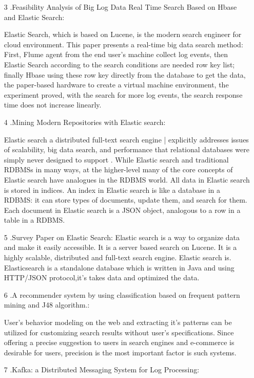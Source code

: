 \documentclass[oneside,a4paper,12pt]{book}
\begin{document}
\begin{enumerate}
\begin{itemize}
   \item[3].Feasibility Analysis of Big Log Data Real Time Search Based on Hbase and Elastic Search: 
 
Elastic Search, which is based on Lucene, is the modern search engineer for cloud environment. This paper presents a real-time big data search method: First, Flume agent from the end user's machine collect log events, then Elastic Search according to the search conditions are needed row key list; finally Hbase using these row key directly from the database to get the data, the paper-based hardware to create a virtual machine environment, the experiment proved, with the search for more log events, the search response time does not increase linearly.

   \item[4].Mining Modern Repositories with Elastic search: 
 
Elastic search  a distributed full-text search engine | explicitly addresses issues of scalability, big data search, and performance that relational databases were simply never designed to support . While Elastic search and traditional RDBMSs
 in many ways, at the higher-level many of the core concepts of Elastic search have analogues in the RDBMS world. All data in Elastic search is stored in indices. An index in Elastic search is like a database in a RDBMS: it can store  types of documents, update them, and search for them. Each document in Elastic search is a JSON object, analogous to a row in a table in a RDBMS.

   \item[5].Survey Paper on Elastic Search:
Elastic search is a way to organize data and make it easily accessible. It is a server based search on Lucene. It is a highly scalable, distributed and full-text search engine. Elastic search is. Elasticsearch is a standalone database which is written in Java and using HTTP/JSON protocol,it’s takes data and optimized the data.
   \item[6].A recommender system by using classification based on frequent pattern mining and J48 algorithm.:

User’s behavior modeling on the web and extracting it’s patterns can be utilized for customizing search results without user’s specifications. Since offering a precise suggestion to users in search engines and e-commerce is desirable for users, precision is the most important factor is such systems.

   \item[7].Kafka: a Distributed Messaging System for Log Processing: 
 

\end{itemize}
\end{enumerate}
\end{document}
